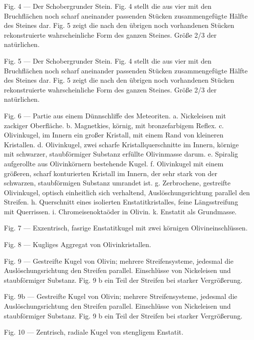 \documentclass[a4paper, 11pt, oneside]{article}
\begin{document}
Fig. 4 --- Der Schobergrunder Stein. Fig. 4 stellt die aus vier mit den Bruchflächen noch scharf aneinander passenden Stücken zusammengefügte Hälfte des Steines dar. Fig. 5 zeigt die nach den übrigen noch vorhandenen Stücken rekonstruierte wahrscheinliche Form des ganzen Steines. Größe 2/3 der natürlichen.

Fig. 5 --- Der Schobergrunder Stein. Fig. 4 stellt die aus vier mit den Bruchflächen noch scharf aneinander passenden Stücken zusammengefügte Hälfte des Steines dar. Fig. 5 zeigt die nach den übrigen noch vorhandenen Stücken rekonstruierte wahrscheinliche Form des ganzen Steines. Größe 2/3 der natürlichen.

Fig. 6 --- Partie aus einem Dünnschliffe des Meteoriten. a. Nickeleisen mit zackiger Oberfläche. b. Magnetkies, körnig, mit bronzefarbigem Reflex. c. Olivinkugel, im Innern ein großer Kristall, mit einem Rand von kleineren Kristallen. d. Olivinkugel, zwei scharfe Kristallquerschnitte im Innern, körnige mit schwarzer, staubförmiger Substanz erfüllte Olivinmasse darum. e. Spiralig aufgerollte aus Olivinkörnern bestehende Kugel. f. Olivinkugel mit einem größeren, scharf konturierten Kristall im Innern, der sehr stark von der schwarzen, staubförmigen Substanz umrandet ist. g. Zerbrochene, gestreifte Olivinkugel, optisch einheitlich sich verhaltend, Auslöschungsrichtung parallel den Streifen. h. Querschnitt eines isolierten Enstatitkristalles, feine Längsstreifung mit Querrissen. i. Chromeisenoktaöder in Olivin. k. Enstatit als Grundmasse.

Fig. 7 --- Exzentrisch, fasrige Enstatitkugel mit zwei körnigen Olivineinschlüssen.

Fig. 8 --- Kugliges Aggregat von Olivinkristallen.

Fig. 9 --- Gestreifte Kugel von Olivin; mehrere Streifensysteme, jedesmal die Auslöschungsrichtung den Streifen parallel. Einschlüsse von Nickeleisen und staubförmiger Substanz. Fig. 9 b ein Teil der Streifen bei starker Vergrößerung.

Fig. 9b --- Gestreifte Kugel von Olivin; mehrere Streifensysteme, jedesmal die Auslöschungsrichtung den Streifen parallel. Einschlüsse von Nickeleisen und staubförmiger Substanz. Fig. 9 b ein Teil der Streifen bei starker Vergrößerung.

Fig. 10 --- Zentrisch, radiale Kugel von stengligem Enstatit.
\end{document}
